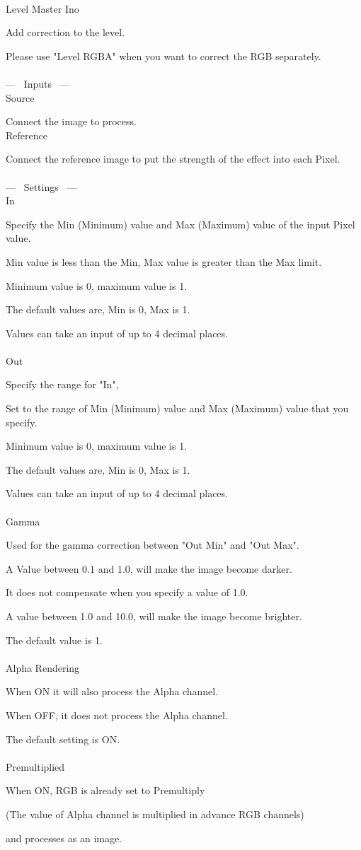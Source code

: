 \documentclass[a4paper,12pt]{article}
\begin{document}
\thispagestyle{empty}

\Large
\noindent \\
Level Master Ino\medskip
\par
\normalsize
Add correction to the level.\par
Please use "Level RGBA" when you want to correct the RGB separately.\\
\\
--- \ Inputs \ ---\\
Source\par
Connect the image to process.\\
Reference\par
Connect the reference image to put the strength of the effect into each Pixel.\\
\\
--- \ Settings \ ---\\
In\par
Specify the Min (Minimum) value and Max (Maximum) value of the input Pixel value.\par
Min value is less than the Min, Max value is greater than the Max limit.\par
Minimum value is 0, maximum value is 1.\par
The default values are, Min is 0, Max is 1.\par
Values can take an input of up to 4 decimal places.\\
\\
Out\par
Specify the range for "In",\par
Set to the range of Min (Minimum) value and Max (Maximum) value that you specify.\par
Minimum value is 0, maximum value is 1.\par
The default values are, Min is 0, Max is 1.\par
Values can take an input of up to 4 decimal places.\\
\\
Gamma\par
Used for the gamma correction between "Out Min" and "Out Max".\par
A Value between 0.1 and 1.0, will make the image become darker.\par
It does not compensate when you specify a value of 1.0.\par
A value between 1.0 and 10.0, will make the image become brighter.\par
The default value is 1.\\
\\
Alpha Rendering\par
When ON it will also process the Alpha channel.\par
When OFF, it does not process the Alpha channel.\par
The default setting is ON.\\
\\
Premultiplied\par
When ON, RGB is already set to Premultiply\par
(The value of Alpha channel is multiplied in advance RGB channels)\par
and processes as an image.
\end{document}
